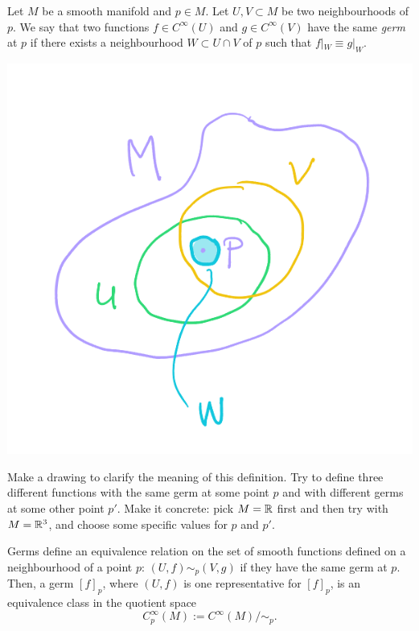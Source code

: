 \begin{definition}
	Let $M$ be a smooth manifold and $p\in M$.
	Let $U,V\subset M$ be two neighbourhoods of $p$.
	We say that two functions $f\in C^\infty(U)$ and $g\in C^\infty(V)$ have the same \emph{germ} at $p$ if there exists a neighbourhood $W\subset U\cap V$ of $p$ such that $f|_W \equiv g|_W$.
\end{definition}
\begin{marginfigure}
	\includegraphics{images/2_3-def_2_3_1.png}
\end{marginfigure}

\begin{exercise}
	Make a drawing to clarify the meaning of this definition.
	Try to define three different functions with the same germ at some point $p$ and with different germs at some other point $p'$.
	Make it concrete: pick $M=\mathbb{R}$ first and then try with $M=\mathbb{R}^3$, and choose some specific values for $p$ and $p'$.
\end{exercise}

Germs define an equivalence relation on the set of smooth functions defined on a neighbourhood of a point $p$: $(U, f) \sim_p (V, g)$ if they have the same germ at $p$. Then, a germ $[f]_p$, where $(U, f)$ is one representative for $[f]_p$, is an equivalence class in the quotient space
\begin{equation}
	C_p^\infty(M) := C^\infty(M)/\!\sim_p.
\end{equation}

